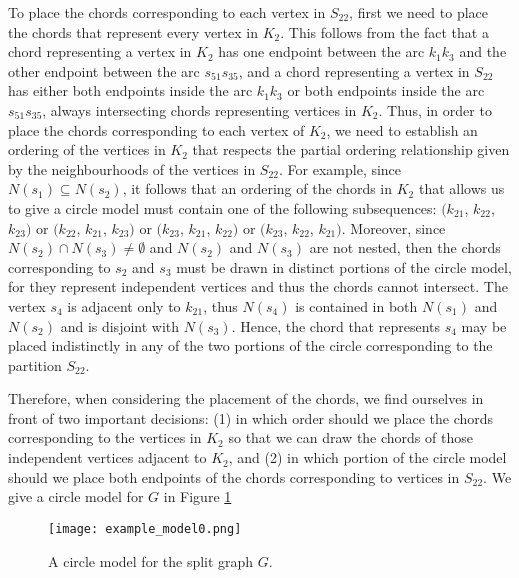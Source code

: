 \documentclass[12pt]{book}
\theoremstyle{plain}
\theoremstyle{remark}
\begin{document}
To place the chords corresponding to each vertex in $S_{22}$, first we need to place the chords that represent every vertex in $K_2$. This follows from the fact that a chord re\-pre\-sen\-ting a vertex in $K_2$ has one endpoint between the arc $k_1 k_3$ and the other endpoint between the arc $s_{51} s_{35}$, and a chord representing a vertex in $S_{22}$ has either both endpoints inside the arc $k_1 k_3$ or both endpoints inside the arc $s_{51} s_{35}$, always intersecting chords representing vertices in $K_2$.
Thus, in order to place the chords corresponding to each vertex of $K_2$, we need to establish an ordering of the vertices in $K_2$ that respects the partial ordering relationship given by the neighbourhoods of the vertices in $S_{22}$. 
For example, since $N(s_1) \subseteq N(s_2)$, it follows that an ordering of the chords in $K_2$ that allows us to give a circle model must contain one of the following subsequences: $(k_{21}$, $k_{22}$, $k_{23})$ or $(k_{22}$, $k_{21}$, $k_{23})$ or $(k_{23}$, $k_{21}$, $k_{22})$ or $(k_{23}$, $k_{22}$, $k_{21})$. Moreover, since $N(s_2) \cap N(s_3) \neq \emptyset$ and $N(s_2)$ and $N(s_3)$ are not nested, then the chords corresponding to $s_2$ and $s_3$ must be drawn in distinct portions of the circle model, for they represent independent vertices and thus the chords cannot intersect. 
The vertex $s_4$ is adjacent only to $k_{21}$, thus $N(s_4)$ is contained in both $N(s_1)$ and $N(s_2)$ and is disjoint with $N(s_3)$. Hence, the chord that represents $s_4$ may be placed indistinctly in any of the two portions of the circle corresponding to the partition $S_{22}$.


Therefore, when considering the placement of the chords, we find ourselves in front of two important decisions: (1) in which order should we place the chords corresponding to the vertices in $K_2$ so that we can draw the chords of those independent vertices adjacent to $K_2$, and (2) in which portion of the circle model should we place both endpoints of the chords corresponding to vertices in $S_{22}$. We give a circle model for $G$ in Figure \ref{fig:example_model0} %

\begin{figure}[h!] 
	\centering
	\texttt{[image: example\_model0.png]}
	\caption{A circle model for the split graph $G$.}
		\label{fig:example_model0}
\end{figure}
\end{document}
